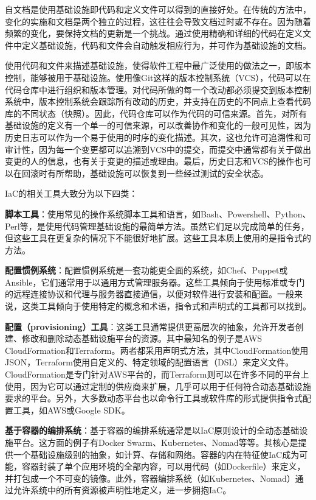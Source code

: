 \documentclass[macfonts,master]{njuthesis}
\begin{document}
自文档是使用基础设施即代码和定义文件可以得到的直接好处。在传统的方法中，变化的实施和文档是两个独立的过程，这往往会导致文档过时或不存在。因为随着频繁的变化，要保持文档的更新是一个挑战。通过使用精确和详细的代码在定义文件中定义基础设施，代码和文件会自动触发相应行为，并可作为基础设施的文档\cite{morris2016infrastructure}\cite{whatisiac}。

使用代码和文件来描述基础设施，使得软件工程中最广泛使用的做法之一，即版本控制，能够被用于基础设施。使用像Git这样的版本控制系统（VCS），代码可以在代码仓库中进行组织和版本管理。对代码所做的每一个改动都必须提交到版本控制系统中，版本控制系统会跟踪所有改动的历史，并支持在历史的不同点上查看代码库的不同状态（快照）。因此，代码仓库可以作为代码的可信来源。首先，对所有基础设施的定义有一个单一的可信来源，可以改善协作和变化的一般可见性，因为历史日志可以作为一个易于使用的时序的变化描述。其次，这也允许可追溯性和可审计性，因为每一个变更都可以追溯到VCS中的提交，而提交中通常都有关于做出变更的人的信息，也有关于变更的描述或理由。最后，历史日志和VCS的操作也可以在回滚时有所帮助，基础设施可以恢复到一些经过测试的安全状态。

IaC的相关工具大致分为以下四类\cite{whatisiac}：

\textbf{脚本工具}：使用常见的操作系统脚本工具和语言，如Bash、Powershell、Python、Perl等，是使用代码管理基础设施的最简单方法。虽然它们足以完成简单的任务，但这些工具在更复杂的情况下不能很好地扩展。这些工具本质上使用的是指令式的方法。

\textbf{配置惯例系统}：配置惯例系统是一套功能更全面的系统，如Chef、Puppet或Ansible，它们通常用于以通用方式管理服务器。这些工具倾向于使用标准或专门的远程连接协议和代理与服务器直接通信，以便对软件进行安装和配置。一般来说，这类工具倾向于使用特定的概念和术语，指令式和声明式的工具都可以找到。

\textbf{配置（provisioning）工具}：这类工具通常提供更高层次的抽象，允许开发者创建、修改和删除动态基础设施平台的资源。其中最知名的例子是AWS CloudFormation和Terraform。两者都采用声明式方法，其中CloudFormation使用JSON，Terraform使用自定义的、特定领域的配置语言（DSL）来定义文件。CloudFormation是专门针对AWS平台的，而Terraform则可以在许多不同的平台上使用，因为它可以通过定制的供应商来扩展，几乎可以用于任何符合动态基础设施要求的平台。另外，大多数动态平台也以命令行工具或软件库的形式提供指令式配置工具，如AWS或Google SDK。

\textbf{基于容器的编排系统}：基于容器的编排系统通常是以IaC原则设计的全动态基础设施平台。这方面的例子有Docker Swarm、Kubernetes、Nomad等等。其核心是提供一个基础设施级别的抽象，如计算、存储和网络。容器的内在特征使IaC成为可能，容器封装了单个应用环境的全部内容，可以用代码（如Dockerfile）来定义，并打包成一个不可变的镜像。此外，容器编排系统（如Kubernetes、Nomad）通过允许系统中的所有资源被声明性地定义，进一步拥抱IaC。
\end{document}
